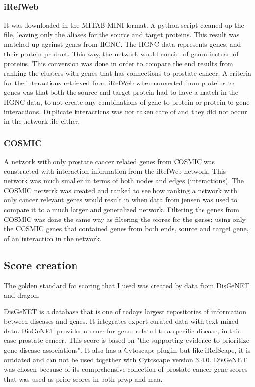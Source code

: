 \subsubsection{iRefWeb}
It was downloaded in the MITAB-MINI format. A python script cleaned up the file,
leaving only the aliases for the source and target proteins. This result was
matched up against genes from HGNC. The HGNC data represents genes, and their
protein product. This way, the network would consist of genes instead of
proteins. This conversion was done in order to compare the end results from
ranking the clusters with genes that has connections to prostate cancer.
A criteria for the interactions retrieved from iRefWeb when converted from
proteins to genes was that both the source and target protein had to have
a match in the HGNC data, to not create any combinations of gene to protein or
protein to gene interactions. Duplicate interactions was not taken care of and
they did not occur in the network file either.

\subsubsection{COSMIC}
A network with only prostate cancer related genes from
COSMIC\cite{cosmic-download} was constructed with interaction information from
the iRefWeb network. This network was much smaller in terms of both nodes and
edges (interactions). The COSMIC network was created and ranked to see how
ranking a network with only cancer relevant genes would result in when data from
jensen was used to compare it to a much larger and generalized network.
Filtering the genes from COSMIC was done the same way as filtering the scores
for the genes; using only the COSMIC genes that contained genes from both ends,
source and target gene, of an interaction in the network.

\subsection{Score creation}
The golden standard for scoring that I used was created by data from
DisGeNET\cite{disgenet} and \gls{dragon}\cite{dragon}. 

DisGeNET is a database that is one of todays largest repositories of information
between diseases and genes.  It integrates expert-curated data with text mined
data. DisGeNET provides a score for genes related to a specific disease, in this
case prostate cancer.  This score is based on "the supporting evidence to
prioritize gene-disease associations"\cite{disgenet}. It also has a Cytoscape
plugin, but like iRefScape, it is outdated and can not be used together with
Cytoscape version 3.4.0. DisGeNET was chosen because of its comprehensive
collection of prostate cancer gene scores that was used as prior scores in both
\gls{prwp} and \gls{maa}.

